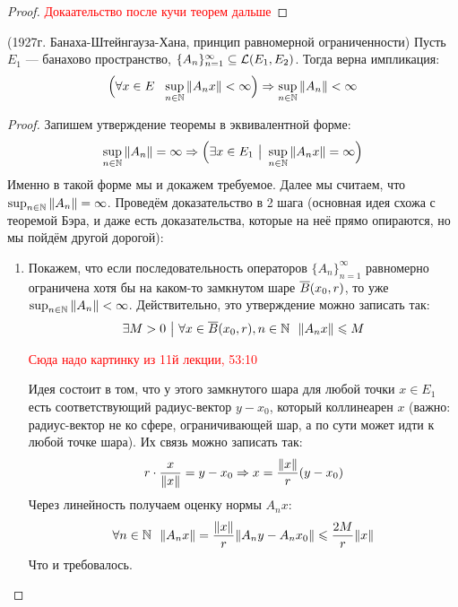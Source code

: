 \begin{proof}
	\textcolor{red}{Докаательство после кучи теорем дальше}
\end{proof}

\begin{theorem} (1927г. Банаха-Штейнгауза-Хана, принцип равномерной ограниченности)
	Пусть $E_1$ --- банахово пространство, $\{A_n\}_{n = 1}^\infty \subseteq \mathcal{L}(E_1, E_2)$. Тогда верна импликация:
	\[
		\Big(\forall x \in E\ \ \sup_{n \in \mathbb{N}} \|A_n x\| < \infty\Big) \Rightarrow \sup_{n \in \mathbb{N}} \|A_n\| < \infty
	\]
\end{theorem}

\begin{proof}
	Запишем утверждение теоремы в эквивалентной форме:
	\[
		\sup_{n \in \mathbb{N}} \|A_n\| = \infty \Rightarrow \Big(\exists x \in E_1 \ \big|\  \sup_{n \in \mathbb{N}} \|A_nx\| = \infty\Big)
	\]
	Именно в такой форме мы и докажем требуемое. Далее мы считаем, что $\sup_{n \in \mathbb{N}} \|A_n\| = \infty$. Проведём доказательство в 2 шага (основная идея схожа с теоремой Бэра, и даже есть доказательства, которые на неё прямо опираются, но мы пойдём другой дорогой):
	\begin{enumerate}
		\item Покажем, что если последовательность операторов $\{A_n\}_{n = 1}^\infty$ равномерно ограничена хотя бы на каком-то замкнутом шаре $\overline{B}(x_0, r)$, то уже $\sup_{n \in \mathbb{N}} \|A_n\| < \infty$. Действительно, это утверждение можно записать так:
		\[
			\exists M > 0 \ \big|\  \forall x \in \overline{B}(x_0, r), n \in \mathbb{N}\ \ \|A_nx\| \leqslant M
		\]
		
		\textcolor{red}{Сюда надо картинку из 11й лекции, 53:10}
		
		Идея состоит в том, что у этого замкнутого шара для любой точки $x \in E_1$ есть соответствующий радиус-вектор $y - x_0$, который коллинеарен $x$ (важно: радиус-вектор не ко сфере, ограничивающей шар, а по сути может идти к любой точке шара). Их связь можно записать так:
		\[
			r \cdot \frac{x}{\|x\|} = y - x_0 \Rightarrow x = \frac{\|x\|}{r}(y - x_0)
		\]
		Через линейность получаем оценку нормы $A_nx$:
		\[
			\forall n \in \mathbb{N}\ \ \|A_nx\| = \frac{\|x\|}{r}\|A_ny - A_nx_0\| \leqslant \frac{2M}{r}\|x\|
		\]
		Что и требовалось.
		

\end{enumerate}
\end{proof}

